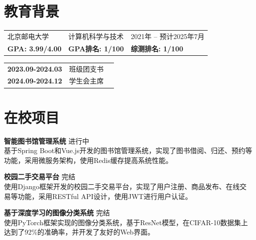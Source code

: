 \section{\makebox[\widthof{\faGraduationCap}][c]{\color{BUPT_Blue}{\faGraduationCap}}\quad 教育背景}
\vspace{-0.5em}
\begin{table}[h!]
    \begin{tabularx}{\textwidth}{XXp{}}
        北京邮电大学 & 计算机科学与技术 & 2021年 -- 预计2025年7月\\
        \textbf{GPA: 3.99/4.00} & \textbf{GPA排名: 1/100} & \textbf{综测排名: 1/100} \\
    \end{tabularx}
\end{table}
\begin{tabularx}{\textwidth}{@{}XlX@{}}
    \textbf{2023.09-2024.03} & 班级团支书 & \\
    \textbf{2024.09-2024.12} & 学生会主席 & \\
\end{tabularx}

\section{\makebox[\widthof{\faChalkboardTeacher}][c]{\color{BUPT_Blue}{\faChalkboardTeacher}}\quad 在校项目}
\vspace{0.5em}
{\large{\textbf{智能图书馆管理系统}}} \hfill {进行中}\\
基于Spring Boot和Vue.js开发的图书馆管理系统，实现了图书借阅、归还、预约等功能，采用微服务架构，使用Redis缓存提高系统性能。

\vspace{1em}
{\large{\textbf{校园二手交易平台}}} \hfill {完结}\\
使用Django框架开发的校园二手交易平台，实现了用户注册、商品发布、在线交易等功能，采用RESTful API设计，使用JWT进行用户认证。

\vspace{1em}
{\large{\textbf{基于深度学习的图像分类系统}}} \hfill {完结}\\
使用PyTorch框架实现的图像分类系统，基于ResNet模型，在CIFAR-10数据集上达到了92\%的准确率，并开发了友好的Web界面。

